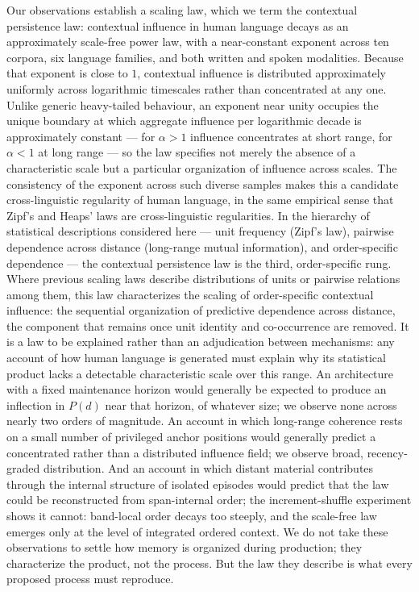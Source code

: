 \documentclass[11pt]{article}
\begin{document}
Our observations establish a scaling law, which we term the
contextual persistence law: contextual influence in human language decays as an approximately
scale-free power law, with a near-constant exponent across ten corpora, six language families,
and both written and spoken modalities. Because that exponent is close to $1$, contextual
influence is distributed approximately uniformly across logarithmic timescales rather than
concentrated at any one. Unlike generic heavy-tailed behaviour, an exponent near unity occupies
the unique boundary at which aggregate influence per logarithmic decade is approximately constant
--- for $\alpha>1$ influence concentrates at short range, for $\alpha<1$ at long range --- so the
law specifies not merely the absence of a characteristic scale but a particular organization of
influence across scales. The
consistency of the exponent across such diverse samples makes this a candidate
cross-linguistic regularity of human language, in the same empirical sense that Zipf's and Heaps'
laws are cross-linguistic regularities. In the hierarchy of statistical descriptions considered here ---
unit frequency (Zipf's law), pairwise dependence across distance (long-range mutual information),
and order-specific dependence --- the contextual persistence law is the third, order-specific rung.
Where previous scaling laws describe distributions of units or pairwise relations among them, this
law characterizes the scaling of order-specific contextual influence: the sequential organization
of predictive dependence across distance, the component that remains once unit identity
and co-occurrence are removed. It is a law to be
explained rather than an adjudication between mechanisms: any account of how
human language is generated must explain why its statistical product lacks a detectable
characteristic scale over this range. An architecture with a fixed maintenance
horizon would generally be expected to produce an inflection in $P(d)$ near that horizon, of
whatever size; we observe none across nearly two orders of magnitude. An account in which long-range coherence rests on a small
number of privileged anchor positions would generally predict a concentrated rather than a
distributed influence field; we observe broad, recency-graded distribution. And an account in
which distant material contributes through the internal structure of isolated episodes would
predict that the law could be reconstructed from span-internal order; the increment-shuffle
experiment shows it cannot: band-local order decays too steeply, and the scale-free law emerges
only at the level of integrated ordered context. We do not take
these observations to settle how memory is organized during production; they characterize
the product, not the process. But the law they describe is what every proposed process
must reproduce.
\end{document}
